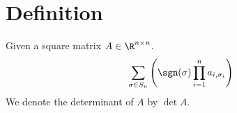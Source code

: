 
\section*{Definition}

Given a square matrix $A \in \R ^{n \times  n}$.
\[
\sum_{\sigma  \in S_n} \left( \sgn(\sigma ) \prod_{i = 1}^{n} a_{i,\sigma _{i}} \right)
\]
We denote the determinant of $A$ by $\det A$.

\blankpage